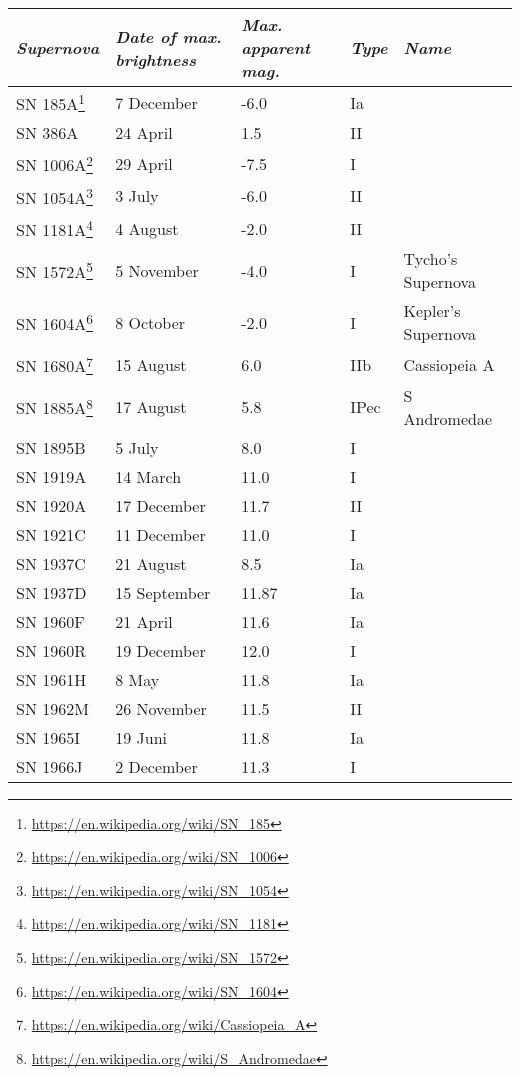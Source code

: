 \begin{longtable}{l|l|l|l|l}\toprule
\emph{Supernova}            & \emph{Date of max. brightness} & \emph{Max. apparent mag.} & \emph{Type} & \emph{Name} \\\midrule
SN 185A\footnote{\url{https://en.wikipedia.org/wiki/SN_185}} & 7 December & -6.0 & Ia & \\\midrule
SN 386A & 24 April & 1.5 & II & \\\midrule
SN 1006A\footnote{\url{https://en.wikipedia.org/wiki/SN_1006}} & 29 April & -7.5 & I & \\\midrule
SN 1054A\footnote{\url{https://en.wikipedia.org/wiki/SN_1054}} & 3 July & -6.0 & II & \\\midrule
SN 1181A\footnote{\url{https://en.wikipedia.org/wiki/SN_1181}} & 4 August & -2.0 & II & \\\midrule
SN 1572A\footnote{\url{https://en.wikipedia.org/wiki/SN_1572}} & 5 November & -4.0 & I & Tycho's Supernova\\\midrule
SN 1604A\footnote{\url{https://en.wikipedia.org/wiki/SN_1604}} & 8 October & -2.0 & I & Kepler's Supernova\\\midrule
SN 1680A\footnote{\url{https://en.wikipedia.org/wiki/Cassiopeia_A}} & 15 August & 6.0 & IIb & Cassiopeia A\\\midrule
SN 1885A\footnote{\url{https://en.wikipedia.org/wiki/S_Andromedae}} & 17 August & 5.8 & IPec & S Andromedae\\\midrule
SN 1895B &  5 July      & 8.0   & I   & \\\midrule
SN 1919A & 14 March     & 11.0  & I   & \\\midrule
SN 1920A & 17 December  & 11.7  & II  & \\\midrule
SN 1921C & 11 December  & 11.0  & I   & \\\midrule
SN 1937C & 21 August    & 8.5   & Ia  & \\\midrule
SN 1937D & 15 September & 11.87 & Ia  & \\\midrule
SN 1960F & 21 April     & 11.6  & Ia  & \\\midrule
SN 1960R & 19 December  & 12.0  & I   & \\\midrule
SN 1961H &  8 May       & 11.8  & Ia  & \\\midrule
SN 1962M & 26 November  & 11.5  & II  & \\\midrule
SN 1965I & 19 Juni      & 11.8  & Ia  & \\\midrule
SN 1966J &  2 December  & 11.3  & I   & \\\midrule

\end{longtable}
